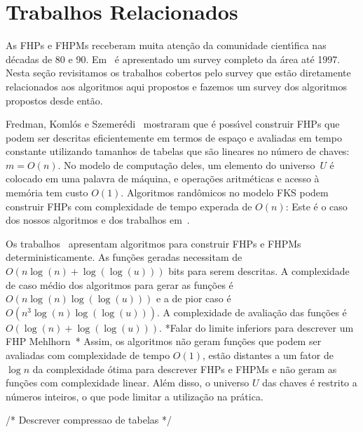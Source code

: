 \section{Trabalhos Relacionados}
As FHPs e FHPMs receberam muita aten\c{c}\~ao da comunidade 
cient\'{\i}fica nas d\'ecadas de 80 e 90. Em~\cite{chm97} \'e 
apresentado um survey completo da \'area at\'e 1997.
Nesta se\c{c}\~ao revisitamos os trabalhos cobertos pelo survey que
est\~ao diretamente relacionados aos algoritmos aqui propostos e
fazemos um survey dos algoritmos propostos desde ent\~ao.
 
Fredman, Koml\'os e Szemer\'edi~\cite{FKS84} mostraram que \'e poss\'{\i}vel construir
FHPs que podem ser descritas eficientemente em termos de espa\c{c}o e avaliadas em 
tempo constante utilizando tamanhos de tabelas que s\~ao lineares no n\'umero de chaves:
$m=O(n)$. 
No modelo de computa\c{c}\~ao deles, um elemento do universo~$U$ \'e colocado em uma 
palavra de m\'aquina, e opera\c{c}\~oes aritm\'eticas e acesso \`a mem\'oria tem custo 
$O(1)$.
Algoritmos rand\^omicos no modelo FKS podem construir FHPs com complexidade de tempo 
experada de $O(n)$: 
Este \'e o caso dos nossos algoritmos e dos trabalhos em~\cite{chm92,p99}.

Os trabalhos~\cite{asw00,swz00} apresentam algoritmos para construir
FHPs e FHPMs deterministicamente. 
As fun\c{c}\~oes geradas necessitam de $O(n \log(n) + \log(\log(u)))$ bits para serem descritas.
A complexidade de caso m\'edio dos algoritmos para gerar as fun\c{c}\~oes \'e 
$O(n\log(n) \log( \log (u)))$ e a de pior caso \'e $O(n^3\log(n) \log(\log(u)))$. 
A complexidade de avalia\c{c}\~ao das fun\c{c}\~oes \'e $O(\log(n) + \log(\log(u)))$.
*Falar do limite inferiors para descrever um FHP Mehlhorn~\cite{m84}*
Assim, os algoritmos n\~ao geram fun\c{c}\~oes que podem ser avaliadas com complexidade 
de tempo $O(1)$, est\~ao distantes a um fator de $\log n$ da complexidade \'otima para descrever 
FHPs e FHPMs e n\~ao geram as fun\c{c}\~oes com complexidade linear.
Al\'em disso, o universo $U$ das chaves \'e restrito a n\'umeros inteiros, o que pode 
limitar a utiliza\c{c}\~ao na pr\'atica. 

/* Descrever compressao de tabelas */
\cite{gss01}

\cite{bkz05}